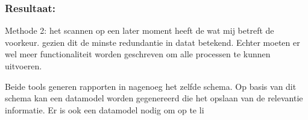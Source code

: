 \subsubsection{Resultaat: } Methode 2: het scannen op een later moment heeft de wat mij betreft de voorkeur. gezien dit de minste redundantie in datat betekend. Echter moeten er wel meer functionaliteit worden geschreven om alle processen te kunnen uitvoeren.

Beide tools generen rapporten in nagenoeg het zelfde schema. Op basis van dit schema kan een datamodel worden gegenereerd die het opslaan van de relevantie informatie. Er is ook een datamodel nodig om op te li





